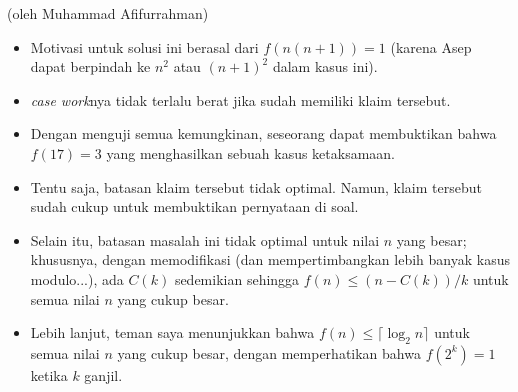 
\newline

\begin{motivasi}(oleh Muhammad Afifurrahman)
    \begin{itemize}
        \item Motivasi untuk solusi ini berasal dari $f(n(n+1))=1$ (karena Asep dapat berpindah ke $n^2$ atau $(n+1)^2$ dalam kasus ini).
\item \textit{case work}nya tidak terlalu berat jika sudah memiliki klaim tersebut.
\item Dengan menguji semua kemungkinan, seseorang dapat membuktikan bahwa $f(17)=3$ yang menghasilkan sebuah kasus ketaksamaan.
\item Tentu saja, batasan klaim tersebut tidak optimal. Namun, klaim tersebut sudah cukup untuk membuktikan pernyataan di soal.
\item Selain itu, batasan masalah ini tidak optimal untuk nilai $n$ yang besar; khususnya, dengan memodifikasi (dan mempertimbangkan lebih banyak kasus modulo...), ada $C(k)$ sedemikian sehingga $f(n)\leq (n-C(k))/k$ untuk semua nilai $n$ yang cukup besar.
\item Lebih lanjut, teman saya menunjukkan bahwa $f(n) \leq \lceil \log_2 n \rceil$ untuk semua nilai $n$ yang cukup besar, dengan memperhatikan bahwa $f(2^{k})=1$ ketika $k$ ganjil. 
    \end{itemize}
\end{motivasi}
